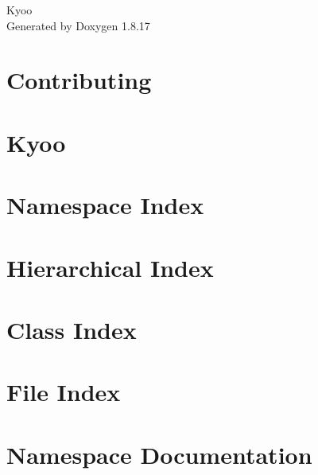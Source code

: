 \let\mypdfximage\pdfximage\def\pdfximage{\immediate\mypdfximage}\documentclass[twoside]{book}
\newcommand{\+}{\discretionary{\mbox{\scriptsize$\hookleftarrow$}}{}{}}
\newcommand{\clearemptydoublepage}{%
  \newpage{\pagestyle{empty}\cleardoublepage}%
}
\begin{document}
\hypersetup{pageanchor=false,
             bookmarksnumbered=true,
             pdfencoding=unicode
            }
\begin{titlepage}
\vspace*{7cm}
\begin{center}%
{\Large Kyoo }\\
\vspace*{1cm}
{\large Generated by Doxygen 1.8.17}\\
\end{center}
\end{titlepage}
\clearemptydoublepage
{}
\tableofcontents
\clearemptydoublepage
{}
\hypersetup{pageanchor=true}

\chapter{Contributing}
\label{md_CONTRIBUTING}

\chapter{Kyoo}
\label{md_README}

\chapter{Namespace Index}

\chapter{Hierarchical Index}

\chapter{Class Index}

\chapter{File Index}

\chapter{Namespace Documentation}

















\end{document}
